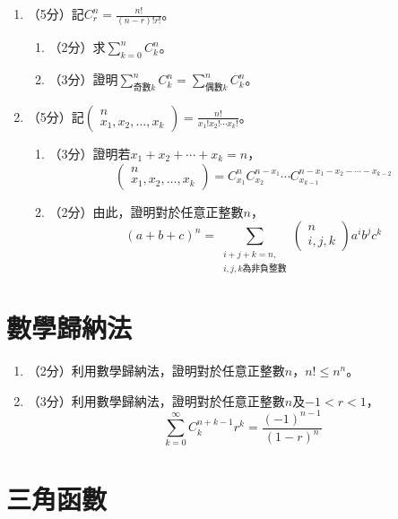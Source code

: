 \documentclass[12pt]{article}
\begin{document}
    \begin{enumerate}
        \item （5分）記$C_r^n=\frac{n!}{(n-r)!r!}$。\begin{enumerate}
            \item （2分）求$\sum_{k=0}^n C_k^n$。
            \item （3分）證明$\sum_{\textrm{奇數}k}^n C_k^n=\sum_{\textrm{偶數}k}^n C_k^n$。
        \end{enumerate}
        \item （5分）記$\begin{pmatrix}
            n\\x_1,x_2,\dots,x_k
        \end{pmatrix}=\frac{n!}{x_1!x_2!\cdots x_k!}$。\begin{enumerate}
            \item （3分）證明若$x_1+x_2+\cdots+x_k=n$，$$\begin{pmatrix}
                n\\x_1,x_2,\dots,x_k
            \end{pmatrix}=C_{x_1}^n C_{x_2}^{n-x_1}\cdots C_{x_{k-1}}^{n-x_1-x_2-\cdots-x_{k-2}}$$
            \item （2分）由此，證明對於任意正整數$n$，$$(a+b+c)^n=\sum_{\substack{i+j+k=n, \\ i,j,k\textrm{為非負整數}}} \begin{pmatrix}
                n\\i,j,k
            \end{pmatrix}a^ib^jc^k$$
        \end{enumerate}
    \end{enumerate}

    \section*{數學歸納法}

    \begin{enumerate}
        \item （2分）利用數學歸納法，證明對於任意正整數$n$，$n!\leq n^n$。
        \item （3分）利用數學歸納法，證明對於任意正整數$n$及$-1<r<1$，$$\sum_{k=0}^\infty C_k^{n+k-1}r^k=\frac{(-1)^{n-1}}{(1-r)^n}$$
    \end{enumerate}

    \section*{三角函數}
\end{document}
